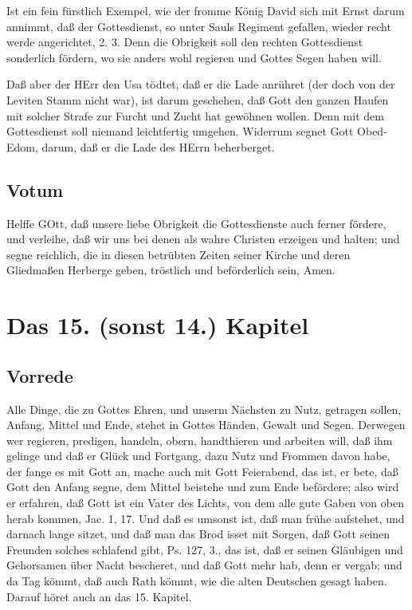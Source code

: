 Ist ein fein fürstlich Exempel, wie der fromme König David sich mit Ernst darum annimmt, daß der Gottesdienst, so unter Sauls Regiment gefallen, wieder recht werde angerichtet, 2. 3. Denn die Obrigkeit soll den rechten Gottesdienst sonderlich fördern, wo sie anders wohl regieren und Gottes Segen haben will.

Daß aber der HErr den Usa tödtet, daß er die Lade anrühret (der doch von der Leviten Stamm nicht war), ist darum geschehen, daß Gott den ganzen Haufen mit solcher Strafe zur Furcht und Zucht hat gewöhnen wollen. Denn mit dem Gottesdienst soll niemand leichtfertig umgehen. Widerrum segnet Gott Obed-Edom, darum, daß er die Lade des HErrn beherberget.

\section{Votum}

Helffe GOtt, daß unsere liebe Obrigkeit die Gottesdienste auch ferner fördere, und verleihe, daß wir uns bei denen als wahre Christen erzeigen und halten; und segne reichlich, die in diesen betrübten Zeiten seiner Kirche und deren Gliedmaßen Herberge geben, tröstlich und beförderlich sein, Amen.

\chapter{Das 15. (sonst 14.) Kapitel}

\section{Vorrede}

Alle Dinge, die zu Gottes Ehren, und unserm Nächsten zu Nutz, getragen sollen, Anfang, Mittel und Ende, stehet in Gottes Händen, Gewalt und Segen. Derwegen wer regieren, predigen, handeln, obern, handthieren und arbeiten will, daß ihm gelinge und daß er Glück und Fortgang, dazu Nutz und Frommen davon habe, der fange es mit Gott an, mache auch mit Gott Feierabend, das ist, er bete, daß Gott den Anfang segne, dem Mittel beistehe und zum Ende befördere; also wird er erfahren, daß Gott ist ein Vater des Lichts, von dem alle gute Gaben von oben herab kommen, Jac. 1, 17. Und daß es umsonst ist, daß man frühe aufstehet, und darnach lange sitzet, und daß man das Brod isset mit Sorgen, daß Gott seinen Freunden solches schlafend gibt, Ps. 127, 3., das ist, daß er seinen Gläubigen und Gehorsamen über Nacht bescheret, und daß Gott mehr hab, denn er vergab; und da Tag kömmt, daß auch Rath kömmt, wie die alten Deutschen gesagt haben. Darauf höret auch an das 15. Kapitel.

